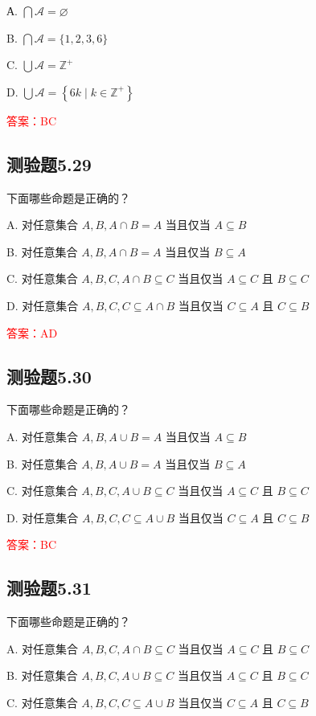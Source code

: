 \documentclass[UTF8, heading=true]{ctexart}
\begin{document}
А. $\bigcap \mathcal{A}=\varnothing$

B. $\bigcap \mathcal{A}=\{1,2,3,6\}$

C. $\bigcup \mathcal{A}=\mathbb{Z}^{+}$

D. $\bigcup \mathcal{A}=\left\{6 k \mid k \in \mathbb{Z}^{+}\right\}$

\textcolor{red}{答案：BC}



\subsection{测验题5.29}
下面哪些命题是正确的？

A. 对任意集合 $A, B, A \cap B=A$ 当且仅当 $A \subseteq B$

B. 对任意集合 $A, B, A \cap B=A$ 当且仅当 $B \subseteq A$

C. 对任意集合 $A, B, C, A \cap B \subseteq C$ 当且仅当 $A \subseteq C$ 且 $B \subseteq C$

D. 对任意集合 $A, B, C, C \subseteq A \cap B$ 当且仅当 $C \subseteq A$ 且 $C \subseteq B$

\textcolor{red}{答案：AD}

\subsection{测验题5.30}
下面哪些命题是正确的？

A. 对任意集合 $A, B, A \cup B=A$ 当且仅当 $A \subseteq B$

B. 
对任意集合 $A, B, A \cup B=A$ 当且仅当 $B \subseteq A$

C. 
对任意集合 $A, B, C, A \cup B \subseteq C$ 当且仅当 $A \subseteq C$ 且 $B \subseteq C$

D. 
对任意集合 $A, B, C, C \subseteq A \cup B$ 当且仅当 $C \subseteq A$ 且 $C \subseteq B$

\textcolor{red}{答案：BC}

\subsection{测验题5.31}

下面哪些命题是正确的？

A. 对任意集合 $A, B, C, A \cap B \subseteq C$ 当且仅当 $A \subseteq C$ 且 $B \subseteq C$

B. 对任意集合 $A, B, C, A \cup B \subseteq C$ 当且仅当 $A \subseteq C$ 且 $B \subseteq C$

C. 对任意集合 $A, B, C, C \subseteq A \cup B$ 当且仅当 $C \subseteq A$ 且 $C \subseteq B$
\end{document}
